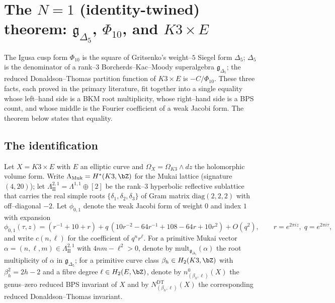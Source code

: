 
\providecommand{\kBKM}{\kappa_{\mathrm{BKM}}}
\providecommand{\kch}{\kappa_{\mathrm{ch}}}
\providecommand{\kcat}{\kappa_{\mathrm{cat}}}
\providecommand{\kfib}{\kappa_{\mathrm{fiber}}}
\providecommand{\ClaimStatusTheorem}{\textbf{[Theorem]}}
\providecommand{\Hilb}{\mathrm{Hilb}}
\providecommand{\Mukai}{\Lambda_{\mathrm{Muk}}}
\providecommand{\gDeltaFive}{\mathfrak{g}_{\Delta_5}}

\section{The $N=1$ (identity-twined) theorem: $\gDeltaFive$, $\Phi_{10}$, and $K3 \times E$}
\label{sec:N1-theorem-publication}

The Igusa cusp form $\Phi_{10}$ is the square of Gritsenko's weight--$5$
Siegel form $\Delta_5$; $\Delta_5$ is the denominator of a rank--$3$
Borcherds--Kac--Moody superalgebra $\gDeltaFive$; the reduced Donaldson--Thomas
partition function of $K3 \times E$ is $-C/\Phi_{10}$. These three facts, each
proved in the primary literature, fit together into a single equality whose
left--hand side is a BKM root multiplicity, whose right--hand side is a BPS
count, and whose middle is the Fourier coefficient of a weak Jacobi form. The
theorem below states that equality.

\subsection{The identification}

Let $X = K3 \times E$ with $E$ an elliptic curve and $\Omega_X = \Omega_{K3} \wedge dz$
the holomorphic volume form. Write $\Mukai = H^\ast(K3, \bZ)$ for the Mukai
lattice (signature $(4,20)$); let $\Lambda^{2,1}_{\mathrm{II}} = \Lambda^{1,1} \oplus [2]$
be the rank--$3$ hyperbolic reflective sublattice that carries the real simple
roots $\{\delta_1, \delta_2, \delta_3\}$ of Gram matrix $\mathrm{diag}(2,2,2)$
with off--diagonal $-2$. Let $\phi_{0,1}$ denote the weak Jacobi form of weight
$0$ and index $1$ with expansion
\[
\phi_{0,1}(\tau, z) = (r^{-1} + 10 + r) + q\,(10 r^{-2} - 64 r^{-1} + 108 - 64 r + 10 r^2) + O(q^2),
\qquad r = e^{2\pi i z},\; q = e^{2\pi i \tau},
\]
and write $c(n, \ell)$ for the coefficient of $q^n r^\ell$. For a primitive
Mukai vector $\alpha = (n, \ell, m) \in \Lambda^{2,1}_{\mathrm{II}}$ with
$4nm - \ell^2 > 0$, denote by $\mathrm{mult}_{\gDeltaFive}(\alpha)$ the root
multiplicity of $\alpha$ in $\gDeltaFive$; for a primitive curve class
$\beta_h \in H_2(K3, \bZ)$ with $\beta_h^2 = 2h-2$ and a fibre degree
$\ell \in H_2(E, \bZ)$, denote by $n^0_{(\beta_h, \ell)}(X)$ the genus--zero
reduced BPS invariant of $X$ and by $N^{\mathrm{DT}}_{(\beta_h, \ell)}(X)$ the
corresponding reduced Donaldson--Thomas invariant.

